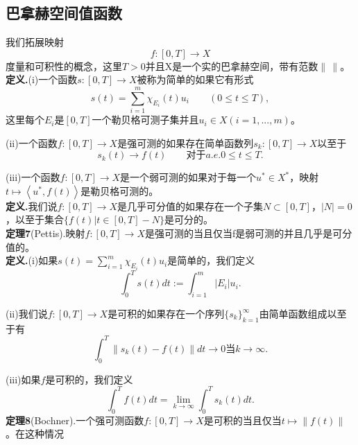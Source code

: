 \documentclass[leqno]{article}%
\begin{document}
\subsection{巴拿赫空间值函数}
我们拓展映射
\begin{equation*}
f:[0,T]\rightarrow X
\end{equation*}
度量和可积性的概念，这里$T>0$并且X是一个实的巴拿赫空间，带有范数$\|\,\|$。\\
\textbf{定义.}(i)一个函数$s:[0,T]\rightarrow X$被称为简单的如果它有形式
\begin{equation*}
s(t)=\sum_{i=1}^{m}\chi_{E_{i}}(t)u_{i}\qquad (0\leq t\leq T),\tag{5}
\end{equation*}
这里每个$E_{i}$是$[0,T]$一个勒贝格可测子集并且$u_{i}\in X(i=1,...,m)$。\par
(ii)一个函数$f:[0,T]\rightarrow X$是强可测的如果存在简单函数列$s_{k}:[0,T]\rightarrow X$以至于
\begin{equation*}
s_{k}(t)\rightarrow f(t)\qquad \text{对于}a.e.0\leq t\leq T.
\end{equation*}
\par
(iii)一个函数$f:[0,T]\rightarrow X$是一个弱可测的如果对于每一个$u^{*}\in X^{*}$，映射$t\mapsto\left<u^{*},f(t)\right>$是勒贝格可测的。\\
\textbf{定义.}我们说$f:[0,T]\rightarrow X$是几乎可分值的如果存在一个子集$N\subset[0,T]$，$|N|=0$，以至于集合$\{f(t)|t\in[0,T]-N\}$是可分的。\\
\textbf{定理7}(Pettis).映射$f:[0,T]\rightarrow X$是强可测的当且仅当f是弱可测的并且几乎是可分值的。\\
\textbf{定义.}(i)如果$s(t)=\sum_{i=1}^{m}\chi_{E_{i}}(t)u_{i}$是简单的，我们定义
\begin{equation}
\int_{0}^{T}s(t)dt:=\int_{i=1}^{m}|E_{i}|u_{i}.\tag{6}
\end{equation}
\par(ii)我们说$f:[0,T]\rightarrow X$是可积的如果存在一个序列$\{s_{k}\}_{k=1}^{\infty}$由简单函数组成以至于有
\begin{equation}
\int_{0}^{T}\|s_{k}(t)-f(t)\|dt\rightarrow 0\text{当}k\rightarrow\infty.\tag{7}
\end{equation}
\par(iii)如果$f$是可积的，我们定义
\begin{equation}
\int_{0}^{T}f(t)dt=\lim_{k\rightarrow\infty}\int_{0}^{T}s_{k}(t)dt.\tag{8}
\end{equation}
\textbf{定理8}(Bochner).一个强可测函数$f:[0,T]\rightarrow X$是可积的当且仅当$t\mapsto \|f(t)\|$。在这种情况
\end{document}
